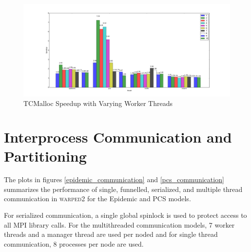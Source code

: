 \documentclass[11pt]{book}
\begin{document}
\begin{figure}
  \centering
  \includegraphics[width=\textwidth,quiet]{figs/memory_allocation/tcmalloc_speedup.pdf}
  \caption{TCMalloc Speedup with Varying Worker Threads}
\end{figure}

\section{Interprocess Communication and Partitioning}

The plots in figures \ref{epidemic_communication} and \ref{pcs_communication} summarizes the
performance of single, funnelled, serialized, and multiple thread communication in \textsc{warped2}
for the Epidemic and PCS models.

For serialized communication, a single global spinlock is used to protect access to all MPI library
calls. For the multithreaded communication models, 7 worker threads and a manager thread are used
per noded and for single thread communication, 8 processes per node are used.
\end{document}
